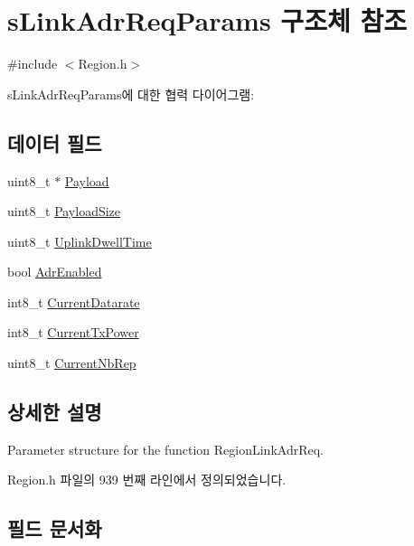 \hypertarget{structs_link_adr_req_params}{}\section{s\+Link\+Adr\+Req\+Params 구조체 참조}
\label{structs_link_adr_req_params}


{\ttfamily \#include $<$Region.\+h$>$}



s\+Link\+Adr\+Req\+Params에 대한 협력 다이어그램\+:
\subsection*{데이터 필드}
\begin{DoxyCompactItemize}
\item 
uint8\+\_\+t $\ast$ \mbox{\hyperlink{structs_link_adr_req_params_a3dfbfe76c8f3bd25765750487b815147}{Payload}}
\item 
uint8\+\_\+t \mbox{\hyperlink{structs_link_adr_req_params_a65009968bd973163423516e80a11c82f}{Payload\+Size}}
\item 
uint8\+\_\+t \mbox{\hyperlink{structs_link_adr_req_params_a0e6663762d6f9173bc8d8cb018f8f17a}{Uplink\+Dwell\+Time}}
\item 
bool \mbox{\hyperlink{structs_link_adr_req_params_ab3e2fb44577c95786e11aacd56769703}{Adr\+Enabled}}
\item 
int8\+\_\+t \mbox{\hyperlink{structs_link_adr_req_params_a928ed703cdac38d74d55ef5e8a45c558}{Current\+Datarate}}
\item 
int8\+\_\+t \mbox{\hyperlink{structs_link_adr_req_params_ac68ea6f7b6f8708b7a5a7fbf13ee3f97}{Current\+Tx\+Power}}
\item 
uint8\+\_\+t \mbox{\hyperlink{structs_link_adr_req_params_a2f3b24e83cdd2600dc9e4374de09f62c}{Current\+Nb\+Rep}}
\end{DoxyCompactItemize}


\subsection{상세한 설명}
Parameter structure for the function Region\+Link\+Adr\+Req. 

Region.\+h 파일의 939 번째 라인에서 정의되었습니다.



\subsection{필드 문서화}
\mbox{\label{structs_link_adr_req_params_ab3e2fb44577c95786e11aacd56769703}} 
